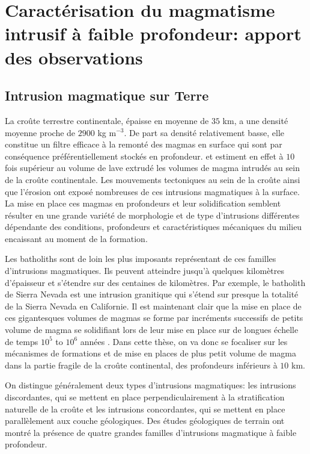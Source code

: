 \section{Caractérisation du  magmatisme intrusif à  faible profondeur:
  apport des observations}
\label{sec:zool-des-intr}

\subsection{Intrusion magmatique sur Terre}
\label{sec:definition}

La croûte terrestre continentale, épaisse en moyenne de $35$ km, a une
densité  moyenne proche  de $2900$  kg m$^{-3}$.   De part  sa densité
relativement basse, elle constitue un filtre efficace à la remonté des
magmas en surface qui  sont par conséquence préférentiellement stockés
en profondeur.  \citet{Crisp:1984dm}  et \citet{White:2006gr} estiment
en effet à  $10$ fois supérieur au volume de  lave extrudé les volumes
de magma intrudés  au sein de la croûte  continentale.  Les mouvements
tectoniques  au sein  de  la  croûte ainsi  que  l’érosion ont  exposé
nombreuses  de ces  intrusions magmatiques  à la  surface. La  mise en
place  ces  magmas  en  profondeurs et  leur  solidification  semblent
résulter en une grande variété  de morphologie et de type d'intrusions
différentes dépendante des conditions, profondeurs et caractéristiques
mécaniques du milieu encaissant au moment de la formation.

Les batholiths  sont de  loin les plus  imposants représentant  de ces
familles  d'intrusions  magmatiques.   Ils peuvent  atteindre  jusqu'à
quelques  kilomètres d'épaisseur  et  s'étendre sur  des centaines  de
kilomètres.   Par  exemple, le  batholith  de  Sierra Nevada  est  une
intrusion granitique qui s'étend sur  presque la totalité de la Sierra
Nevada en Californie.  Il est maintenant clair que la mise en place de
ces gigantesques volumes de magmas  se forme par incréments successifs
de petits  volume de magma se  solidifiant lors de leur  mise en place
sur   de  longues   échelle   de  temps   $10^5$   to  $10^6$   années
\citep{Petford:2000cc,Glazner:2004gv}. Dans cette thèse, on va donc se
focaliser sur  les mécanismes de  formations et  de mise en  places de
plus  petit volume  de  magma  dans la  partie  fragile  de la  croûte
continental, des profondeurs inférieurs à $10$ km.

On  distingue généralement  deux types  d'intrusions magmatiques:  les
intrusions discordantes, qui se mettent en place perpendiculairement à
la   stratification  naturelle   de  la   croûte  et   les  intrusions
concordantes,  qui  se  mettent  en  place  parallèlement  aux  couche
géologiques. Des études géologiques de  terrain ont montré la présence
de   quatre  grandes   familles  d'intrusions   magmatique  à   faible
profondeur.

